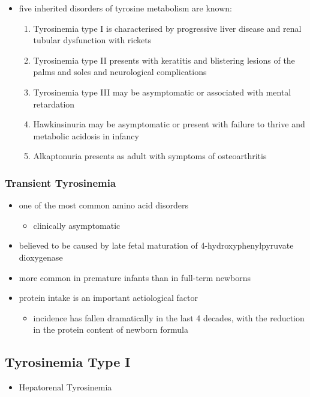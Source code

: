 \documentclass{scrartcl}
\begin{document}
\begin{itemize}
\item five inherited disorders of tyrosine metabolism are known:
\begin{enumerate}
\item Tyrosinemia type I is characterised by progressive
liver disease and renal tubular dysfunction with rickets
\item Tyrosinemia type II presents with keratitis and
blistering lesions of the palms and soles and neurological
complications
\item Tyrosinemia type III may be asymptomatic or associated with
mental retardation
\item Hawkinsinuria may be asymptomatic or present with failure to
thrive and metabolic acidosis in infancy
\item Alkaptonuria presents as adult with symptoms of osteoarthritis
\end{enumerate}
\end{itemize}

\subsubsection{Transient Tyrosinemia}
\label{sec:orgf3c1137}
\begin{itemize}
\item one of the most common amino acid disorders
\begin{itemize}
\item clinically asymptomatic
\end{itemize}
\item believed to be caused by late fetal maturation of
4-hydroxyphenylpyruvate dioxygenase
\item more common in premature infants than in full-term newborns
\item protein intake is an important aetiological factor
\begin{itemize}
\item incidence has fallen dramatically in the last 4 decades, with the
reduction in the protein content of newborn formula
\end{itemize}
\end{itemize}

\subsection{Tyrosinemia Type I}
\label{sec:org3c79a95}
\begin{itemize}
\item Hepatorenal Tyrosinemia
\end{itemize}
\end{document}
